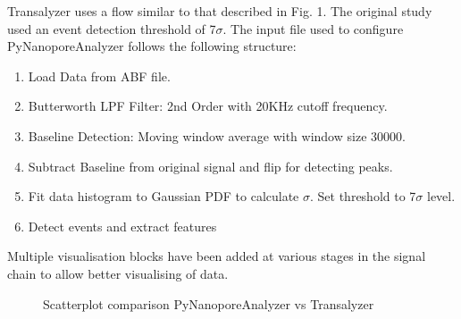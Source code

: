 \documentclass[journal]{IEEEtran}
\begin{document}
Transalyzer uses a flow similar to that described in Fig. 1. The original study used an event detection threshold of 7$\sigma$. The input file used to configure PyNanoporeAnalyzer follows the following structure:
\begin{enumerate}{}{}
    \item {Load Data from ABF file.}
    \item {Butterworth LPF Filter: 2nd Order with 20KHz cutoff frequency.}
    \item {Baseline Detection: Moving window average with window size 30000.}
    \item {Subtract Baseline from original signal and flip for detecting peaks.}
    \item {Fit data histogram to Gaussian PDF to calculate $\sigma$. Set threshold to 7$\sigma$ level.}
    \item {Detect events and extract features}
\end{enumerate}
Multiple visualisation blocks have been added at various stages in the signal chain to allow better visualising of data.

\begin{figure}
  \centering
  \caption{Scatterplot comparison PyNanoporeAnalyzer vs Transalyzer}
\end{figure}
\end{document}
